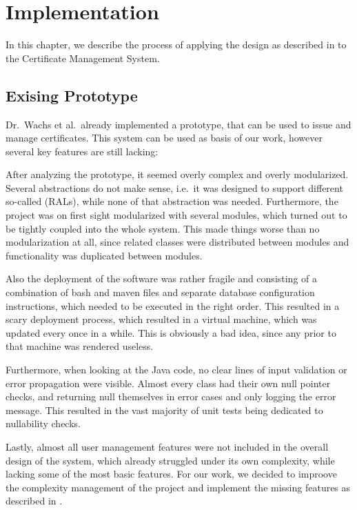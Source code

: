 \chapter{Implementation}\label{ch:implementation}
In this chapter, we describe the process of applying the design as described in  to the
Certificate Management System.

\section{Exising Prototype}\label{sec:exisingPrototype}
Dr.\ Wachs et al.\ already implemented a prototype, that can be used to issue and manage certificates.
This system can be used as basis of our work, however several key features are still lacking:

After analyzing the prototype, it seemed overly complex and overly modularized.
Several abstractions do not make sense, i.e.\ it was designed to support different so-called  (RALs), while none of that abstraction was needed.
Furthermore, the project was on first sight modularized with several  modules, which turned out to be
tightly coupled into the whole system.
This made things worse than no modularization at all, since related classes were distributed between modules and
functionality was duplicated between modules.

Also the deployment of the software was rather fragile and consisting of a combination of bash and maven files and
separate database configuration instructions, which needed to be executed in the right order.
This resulted in a scary deployment process, which resulted in a virtual machine, which was updated every once in a
while.
This is obviously a bad idea, since any  prior to that machine was rendered useless.

Furthermore, when looking at the Java code, no clear lines of input validation or error propagation were visible.
Almost every class had their own null pointer checks, and returning null themselves in error cases and only logging the
error message.
This resulted in the vast majority of unit tests being dedicated to nullability checks.

Lastly, almost all user management features were not included in the overall design of the system, which already
struggled under its own complexity, while lacking some of the most basic features.
For our work, we decided to improove the complexity management of the project and implement the missing features as
described in .

